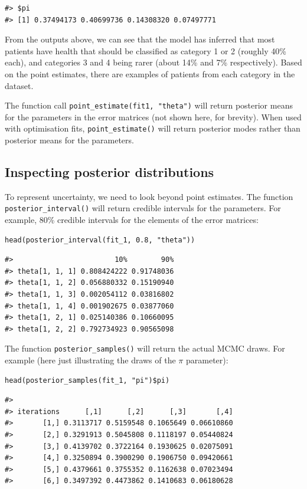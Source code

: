 \begin{verbatim}
#> $pi
#> [1] 0.37494173 0.40699736 0.14308320 0.07497771
\end{verbatim}

From the outputs above, we can see that the model has inferred that most
patients have health that should be classified as category 1 or 2 (roughly 40\%
each), and categories 3 and 4 being rarer (about 14\% and 7\% respectively).
Based on the point estimates, there are examples of patients from each category
in the dataset.

The function call \texttt{point\_estimate(fit1,\ "theta")} will return posterior
means for the parameters in the error matrices (not shown here, for brevity).
When used with optimisation fits, \texttt{point\_estimate()} will return
posterior modes rather than posterior means for the parameters.

\hypertarget{inspecting-posterior-distributions}{%
\subsection{Inspecting posterior distributions}\label{inspecting-posterior-distributions}}

To represent uncertainty, we need to look beyond point estimates. The function
\texttt{posterior\_interval()} will return credible intervals for the parameters.
For example, 80\% credible intervals for the elements of the error matrices:

\begin{verbatim}
head(posterior_interval(fit_1, 0.8, "theta"))
\end{verbatim}

\begin{verbatim}
#>                        10%        90%
#> theta[1, 1, 1] 0.808424222 0.91748036
#> theta[1, 1, 2] 0.056880332 0.15190940
#> theta[1, 1, 3] 0.002054112 0.03816802
#> theta[1, 1, 4] 0.001902675 0.03877060
#> theta[1, 2, 1] 0.025140386 0.10660095
#> theta[1, 2, 2] 0.792734923 0.90565098
\end{verbatim}

The function \texttt{posterior\_samples()} will return the actual MCMC draws. For
example (here just illustrating the draws of the \(\pi\) parameter):

\begin{verbatim}
head(posterior_samples(fit_1, "pi")$pi)
\end{verbatim}

\begin{verbatim}
#>           
#> iterations      [,1]      [,2]      [,3]       [,4]
#>       [1,] 0.3113717 0.5159548 0.1065649 0.06610860
#>       [2,] 0.3291913 0.5045808 0.1118197 0.05440824
#>       [3,] 0.4139702 0.3722164 0.1930625 0.02075091
#>       [4,] 0.3250894 0.3900290 0.1906750 0.09420661
#>       [5,] 0.4379661 0.3755352 0.1162638 0.07023494
#>       [6,] 0.3497392 0.4473862 0.1410683 0.06180628
\end{verbatim}

